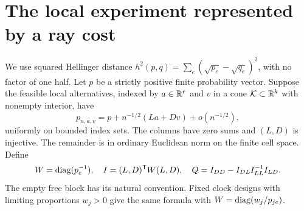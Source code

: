 \section{The local experiment represented by a ray cost}\label{sec:experiment}
We use squared Hellinger distance $h^2(p,q)=\sum_e(\sqrt{p_e}-\sqrt{q_e})^2$, with no factor of one half. Let $p$ be a strictly positive finite probability vector. Suppose the feasible local alternatives, indexed by $a\in\mathbb R^r$ and $v$ in a cone $\mathcal K\subset\mathbb R^k$ with nonempty interior, have
\begin{equation}\label{eq:LAN-model}
 p_{n,a,v}=p+n^{-1/2}(La+Dv)+o(n^{-1/2}),
\end{equation}
uniformly on bounded index sets. The columns have zero sums and $(L,D)$ is injective. The remainder is in ordinary Euclidean norm on the finite cell space. Define
\[
 W=\operatorname{diag}(p_e^{-1}),\quad I=(L,D)^{\mathsf T}W(L,D),\quad
 Q=I_{DD}-I_{DL}I_{LL}^{-1}I_{LD}.
\]
The empty free block has its natural convention. Fixed clock designs with limiting proportions $w_j>0$ give the same formula with $W=\operatorname{diag}(w_j/p_{je})$.

